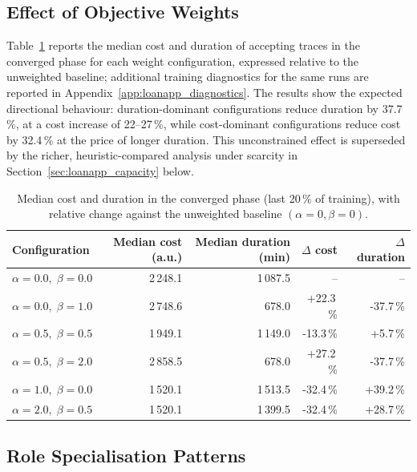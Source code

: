 \subsection{Effect of Objective Weights}
\label{sec:loanapp_weight_effects}

Table~\ref{tab:loanapp_relative} reports the median cost and duration
of accepting traces in the converged phase for each weight
configuration, expressed relative to the unweighted baseline;
additional training diagnostics for the same runs are reported in
Appendix~\ref{app:loanapp_diagnostics}. The results show the expected
directional behaviour: duration-dominant configurations reduce
duration by 37.7\,\%, at a cost increase of 22--27\,\%, while
cost-dominant configurations reduce cost by 32.4\,\% at the price of
longer duration. This unconstrained effect is superseded by the
richer, heuristic-compared analysis under scarcity in
Section~\ref{sec:loanapp_capacity} below.

\begin{table}[H]
\centering
\caption{Median cost and duration in the converged phase (last 20\,\%
of training), with relative change against the unweighted baseline
$(\alpha=0,\beta=0)$.}
\label{tab:loanapp_relative}
{\renewcommand{\arraystretch}{1.2}
\setlength{\tabcolsep}{4pt}
\begin{tabular}{lrrrr}
\toprule
\textbf{Configuration} & \textbf{Median cost (a.u.)} & \textbf{Median duration (min)}
  & \textbf{$\Delta$ cost} & \textbf{$\Delta$ duration} \\
\midrule
$\alpha=0.0,\;\beta=0.0$ & 2\,248.1 & 1\,087.5 & --       & --       \\
$\alpha=0.0,\;\beta=1.0$ & 2\,748.6 &   678.0 & +22.3\,\% & -37.7\,\% \\
$\alpha=0.5,\;\beta=0.5$ & 1\,949.1 & 1\,149.0 & -13.3\,\% & +5.7\,\%  \\
$\alpha=0.5,\;\beta=2.0$ & 2\,858.5 &   678.0 & +27.2\,\% & -37.7\,\% \\
$\alpha=1.0,\;\beta=0.0$ & 1\,520.1 & 1\,513.5 & -32.4\,\% & +39.2\,\% \\
$\alpha=2.0,\;\beta=0.5$ & 1\,520.1 & 1\,399.5 & -32.4\,\% & +28.7\,\% \\
\bottomrule
\end{tabular}}
\end{table}

\subsection{Role Specialisation Patterns}
\label{sec:loanapp_roles}


